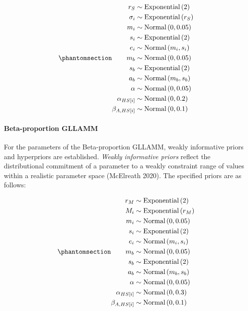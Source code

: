 \documentclass[
sn-apacite
]{sn-jnl}
\let\oldparagraph\paragraph
\renewcommand{\paragraph}[1]{\oldparagraph{#1}\mbox{}}
\begin{document}
\begin{equation}\phantomsection\label{eq-normal-LMM-priors}{
\begin{aligned}
r_{S} &\sim \text{Exponential}\left( 2 \right) \\ 
\sigma_{i} &\sim \text{Exponential}\left( r_{S} \right) \\
m_{i} &\sim \text{Normal} \left( 0, 0.05 \right) \\
s_{i} &\sim \text{Exponential} \left( 2 \right) \\
e_{i} &\sim \text{Normal} \left( m_{i}, s_{i} \right) \\
m_{b} &\sim \text{Normal} \left( 0, 0.05 \right) \\
s_{b} &\sim \text{Exponential} \left( 2 \right) \\
a_{b} &\sim \text{Normal} \left( m_{b}, s_{b} \right) \\
\alpha &\sim \text{Normal} \left( 0, 0.05 \right) \\
\alpha_{HS[i]} &\sim \text{Normal} \left( 0, 0.2 \right) \\
\beta_{A,HS[i]} &\sim \text{Normal} \left( 0, 0.1 \right)
\end{aligned} 
}\end{equation}

\paragraph{Beta-proportion GLLAMM}\label{sec-M-SM-P-BGLLAMM}

For the parameters of the Beta-proportion GLLAMM, weakly informative
priors and hyperpriors are established. \emph{Weakly informative priors}
reflect the distributional commitment of a parameter to a weakly
constraint range of values within a realistic parameter space (McElreath
2020). The specified priors are as follows:

\begin{equation}\phantomsection\label{eq-beta-GLLAMM-priors}{
\begin{aligned}
r_{M} &\sim \text{Exponential}\left( 2 \right) \\ 
M_{i} &\sim \text{Exponential}\left( r_{M} \right) \\
m_{i} &\sim \text{Normal} \left( 0, 0.05 \right) \\
s_{i} &\sim \text{Exponential} \left( 2 \right) \\
e_{i} &\sim \text{Normal} \left( m_{i}, s_{i} \right) \\
m_{b} &\sim \text{Normal} \left( 0, 0.05 \right) \\
s_{b} &\sim \text{Exponential} \left( 2 \right) \\
a_{b} &\sim \text{Normal} \left( m_{b}, s_{b} \right) \\
\alpha &\sim \text{Normal} \left( 0, 0.05 \right) \\
\alpha_{HS[i]} &\sim \text{Normal} \left( 0, 0.3 \right) \\
\beta_{A,HS[i]} &\sim \text{Normal} \left( 0, 0.1 \right)
\end{aligned} 
}\end{equation}
\end{document}
